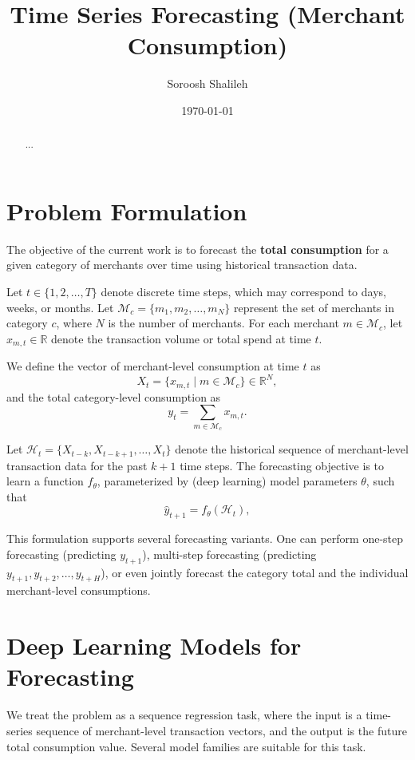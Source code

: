 \documentclass{article}
\title{Time Series Forecasting (Merchant Consumption)}
\author{Soroosh Shalileh}
\date{\today}
\begin{document}
\maketitle

\begin{abstract}
...
\end{abstract}


\section{Problem Formulation}

The objective of the current work is to forecast the \textbf{total consumption} for a given category of merchants over time using historical transaction data.


Let \( t \in \{1, 2, \dots, T\} \) denote discrete time steps, which may correspond to days, weeks, or months. Let \( \mathcal{M}_c = \{m_1, m_2, \dots, m_N\} \) represent the set of merchants in category \( c \), where \( N \) is the number of merchants. For each merchant \( m \in \mathcal{M}_c \), let \( x_{m,t} \in \mathbb{R} \) denote the transaction volume or total spend at time \( t \).

We define the vector of merchant-level consumption at time \( t \) as
\[
X_t = \{x_{m,t} \mid m \in \mathcal{M}_c\} \in \mathbb{R}^N,
\]
and the total category-level consumption as
\[
y_t = \sum_{m \in \mathcal{M}_c} x_{m,t}.
\]


Let \( \mathcal{H}_t = \{X_{t-k}, X_{t-k+1}, \dots, X_t\} \) denote the historical sequence of merchant-level transaction data for the past \( k+1 \) time steps.
The forecasting objective is to learn a function \( f_\theta \), parameterized by (deep learning) model parameters \( \theta \), such that
\[
\hat{y}_{t+1} = f_\theta(\mathcal{H}_t),
\]



This formulation supports several forecasting variants. One can perform one-step forecasting (predicting \( y_{t+1} \)), multi-step forecasting (predicting \( y_{t+1}, y_{t+2}, \dots, y_{t+H} \)), or even jointly forecast the category total and the individual merchant-level consumptions.

\section{Deep Learning Models for Forecasting}

We treat the problem as a sequence regression task, where the input is a time-series sequence of merchant-level transaction vectors, and the output is the future total consumption value. Several model families are suitable for this task.
\end{document}
